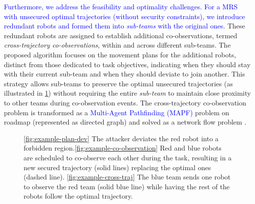 \documentclass[10pt,twocolumn,twoside]{IEEEtran}
\newcommand{\new}[1]{\textcolor{blue}{#1}}
\newcommand{\news}{\color{blue}}
\begin{document}
\new{Furthermore, we address the feasibility and optimality challenges. For a MRS with unsecured optimal trajectories (without security constraints), we introduce redundant robots and formed them into \emph{sub-teams} with the original ones.} These redundant robots are assigned to establish additional co-observations, termed \emph{cross-trajectory co-observations}, within and across different sub-teams. The proposed algorithm focuses on the movement plans for the additional robots, distinct from those dedicated to task objectives, indicating when they should stay with their current sub-team and when they should deviate to join another. This strategy allows sub-teams to preserve the optimal unsecured trajectories (as illustrated in \cref{fig:cross-traj-comparison-set}) without requiring the entire \emph{sub-team} to maintain close proximity to other teams during co-observation events. The cross-trajectory co-observation problem is transformed as a \new{Multi-Agent Pathfinding (MAPF)} problem on roadmap (represented as directed graph) and solved as a network flow problem \cite{yu2013multi}.

\begin{figure}
	\centering
    
    \caption{{\news \ref{fig:example-plan-dev} The attacker deviates the red robot into a forbidden region.\ref{fig:example-co-observation} Red and blue robots are scheduled to co-observe each other during the task, resulting in a new secured trajectory (solid lines) replacing the optimal ones (dashed line). \ref{fig:example-cross-traj} The blue team sends one robot to observe the red team (solid blue line) while having the rest of the robots follow the optimal trajectory.}\label{fig:cross-traj-comparison-set}}
\end{figure}
\end{document}
